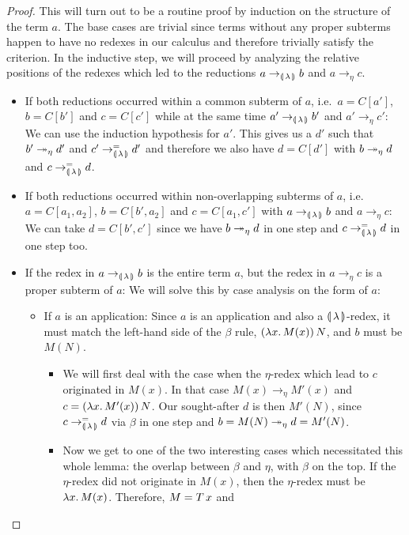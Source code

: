 \begin{proof}
  This will turn out to be a routine proof by induction on the structure of
  the term $a$. The base cases are trivial since terms without any proper
  subterms happen to have no redexes in our calculus and therefore
  trivially satisfy the criterion. In the inductive step, we will proceed
  by analyzing the relative positions of the redexes which led to the
  reductions $a \to_{\llparenthesis \, \lambda \, \rrparenthesis} b$ and $a \to_\eta c$.
  \begin{itemize}
  \item If both reductions occurred within a common subterm of $a$, i.e.\
    $a = C[a']$, $b = C[b']$ and $c = C[c']$ while at the same time
    $a' \to_{\llparenthesis \, \lambda \, \rrparenthesis} b'$ and $a' \to_\eta c'$: We can use the induction
    hypothesis for $a'$. This gives us a $d'$ such that $b' \twoheadrightarrow_\eta d'$
    and $c' \to_{\llparenthesis \, \lambda \, \rrparenthesis}^= d'$ and therefore we also have $d = C[d']$ with
    $b \twoheadrightarrow_\eta d$ and $c \to_{\llparenthesis \, \lambda \, \rrparenthesis}^= d$.
  \item If both reductions occurred within non-overlapping subterms of $a$,
    i.e.\ $a = C[a_1, a_2]$, $b = C[b', a_2]$ and $c = C[a_1, c']$ with
    $a \to_{\llparenthesis \, \lambda \, \rrparenthesis} b$ and $a \to_\eta c$: We can take $d = C[b', c']$ since
    we have $b \twoheadrightarrow_\eta d$ in one step and $c \to_{\llparenthesis \, \lambda \, \rrparenthesis}^= d$ in one step
    too.
  \item If the redex in $a \to_{\llparenthesis \, \lambda \, \rrparenthesis} b$ is the entire term $a$, but the
    redex in $a \to_\eta c$ is a proper subterm of $a$: We will solve this
    by case analysis on the form of $a$:
    \begin{itemize}
    \item If $a$ is an application: Since $a$ is an application and also a
      $\llparenthesis \, \lambda \, \rrparenthesis$-redex, it must match the left-hand side of the
      $\beta$ rule, $(\lambda x.\, M(x))\,N$, and $b$ must be $M(N)$.
      \begin{itemize}
      \item We will first deal with the case when the $\eta$-redex which
        lead to $c$ originated in $M(x)$. In that case
        $M(x) \to_\eta M'(x)$ and $c = (\lambda x.\, M'(x))\,N$. Our
        sought-after $d$ is then $M'(N)$, since $c \to_{\llparenthesis \, \lambda \, \rrparenthesis}^= d$ via
        $\beta$ in one step and $b = M(N) \twoheadrightarrow_\eta d = M'(N)$.
      \item Now we get to one of the two interesting cases which
        necessitated this whole lemma: the overlap between $\beta$ and
        $\eta$, with $\beta$ on the top. If the $\eta$-redex did not
        originate in $M(x)$, then the $\eta$-redex must be
        $\lambda x.\, M(x)$. Therefore, $M = T\,x$ and

\end{itemize}
\end{itemize}
\end{itemize}
\end{proof}
